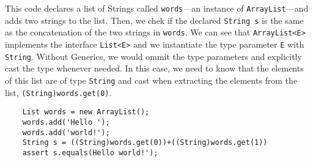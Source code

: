 This code declares a list of Strings called \lstinline|words|---an instance of \lstinline|ArrayList|---and adds two strings to the list. Then, we chek if the declared \lstinline|String s| is the same as the concatenation of the two strings in \lstinline|words|.
We can see that \lstinline|ArrayList<E>| implements the interface \lstinline|List<E>| and we instantiate the type parameter \lstinline|E| with \lstinline|String|. Without Generics, we would ommit the type parameters and explicitly cast the type whenever needed. In this case, we need to know that the elements of this list are of type \lstinline|String| and cast when extracting the elements from the list, \lstinline|(String)words.get(0)|.
\begin{lstlisting}
    List words = new ArrayList();
    words.add('Hello ');
    words.add('world!');
    String s = ((String)words.get(0))+((String)words.get(1)) 
    assert s.equals(Hello world!');
\end{lstlisting}



\LIMPA